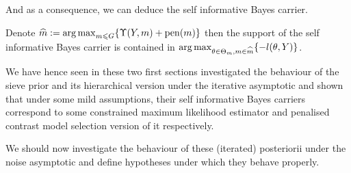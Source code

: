 And as a consequence, we can deduce the self informative Bayes carrier.

\begin{thm}\label{THM_BAYES_HIERARCHICAL_LIMIT}
Denote $\widehat{m} := \operatorname*{arg\,max}\nolimits_{m \leqslant G} \{\Upsilon(Y, m) + \operatorname{pen}(m)\}$ then the support of the self informative Bayes carrier is contained in $\operatorname*{arg\,max}\nolimits_{\theta \in \Theta_{m}, m \in \widehat{m}}\{-l(\theta, Y)\}$.
\end{thm}

We have hence seen in these two first sections investigated the behaviour of the sieve prior and its hierarchical version under the iterative asymptotic and shown that under some mild assumptions, their self informative Bayes carriers correspond to some constrained maximum likelihood estimator and penalised contrast model selection version of it respectively.

We should now investigate the behaviour of these (iterated) posteriorii under the noise asymptotic and define hypotheses under which they behave properly.